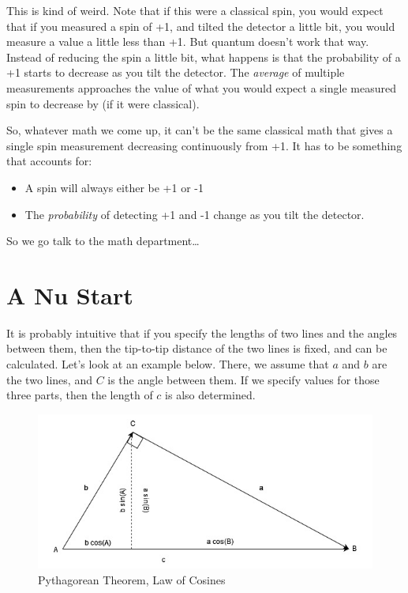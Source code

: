 \documentclass[
]{book}
\providecommand{\tightlist}{%
  \setlength{\itemsep}{0pt}\setlength{\parskip}{0pt}}
\begin{document}
This is kind of weird. Note that if this were a classical spin, you would expect that if you measured a spin of +1, and tilted the detector a little bit, you would measure a value a little less than +1. But quantum doesn't work that way. Instead of reducing the spin a little bit, what happens is that the probability of a +1 starts to decrease as you tilt the detector. The \emph{average} of multiple measurements approaches the value of what you would expect a single measured spin to decrease by (if it were classical).

So, whatever math we come up, it can't be the same classical math that gives a single spin measurement decreasing continuously from +1. It has to be something that accounts for:

\begin{itemize}
\tightlist
\item
  A spin will always either be +1 or -1
\item
  The \emph{probability} of detecting +1 and -1 change as you tilt the detector.
\end{itemize}

So we go talk to the math department\ldots{}

\hypertarget{a-nu-start}{%
\chapter{A Nu Start}\label{a-nu-start}}

It is probably intuitive that if you specify the lengths of two lines and the angles between them, then the tip-to-tip distance of the two lines is fixed, and can be calculated. Let's look at an example below. There, we assume that \(a\) and \(b\) are the two lines, and \(C\) is the angle between them. If we specify values for those three parts, then the length of \(c\) is also determined.

\begin{figure}

{\centering \includegraphics[width=0.75\linewidth,height=0.75\textheight]{images/LofC-PythThm} 

}

\caption{Pythagorean Theorem, Law of Cosines}\label{fig:unnamed-chunk-12}
\end{figure}
\end{document}
